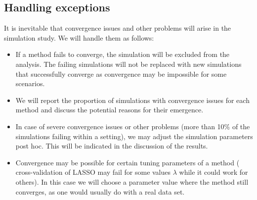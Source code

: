 \subsection{Handling exceptions} \label{sec:exceptions}
It is inevitable that convergence issues and other problems will arise
in the simulation study. We will handle them as follows:
\begin{itemize}
  \item If a method fails to converge, the simulation will be excluded from the
  analysis. The failing simulations will not be replaced with new simulations that
  successfully converge as convergence may be impossible for some scenarios.
  \item We will report the proportion of simulations with convergence issues
  for each method and discuss the potential reasons for their emergence.
  \item In case of severe convergence issues or other problems (more than 10\% of the
  simulations failing within a setting), we may adjust
  the simulation parameters post hoc. This will be indicated in the discussion of
  the results.
  \item Convergence may be possible for certain tuning parameters of a method
  (\eg{} cross-validation of LASSO may fail for some values $\lambda$ while it could
  work for others). In this case we will choose a parameter value where the method
  still converges, as one would usually do with a real data set.

\end{itemize}




